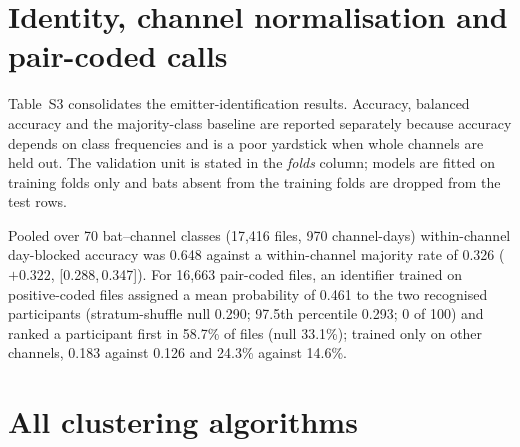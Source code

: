 \documentclass[11pt]{article}
\newcommand{\ci}[2]{[#1,\,#2]}
\begin{document}
\section{Identity, channel normalisation and pair-coded calls}
Table~S3 consolidates the emitter-identification results. Accuracy, balanced accuracy and the majority-class baseline are reported separately because accuracy depends on class frequencies and is a poor yardstick when whole channels are held out. The validation unit is stated in the \emph{folds} column; models are fitted on training folds only and bats absent from the training folds are dropped from the test rows.

Pooled over 70 bat--channel classes (17,416 files, 970 channel-days) within-channel day-blocked accuracy was 0.648 against a within-channel majority rate of 0.326 ($+0.322$, \ci{0.288}{0.347}). For 16,663 pair-coded files, an identifier trained on positive-coded files assigned a mean probability of 0.461 to the two recognised participants (stratum-shuffle null 0.290; 97.5th percentile 0.293; 0 of 100) and ranked a participant first in 58.7\% of files (null 33.1\%); trained only on other channels, 0.183 against 0.126 and 24.3\% against 14.6\%.

\section{All clustering algorithms}
\end{document}
